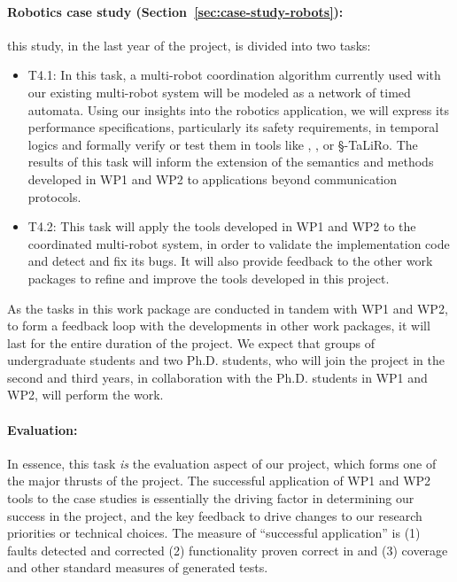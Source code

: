 \paragraph {Robotics case study (Section~\ref{sec:case-study-robots}):} this study, in the last year of the project, is divided into two tasks:
\noindent \begin{itemize}[labelsep=3pt,leftmargin=12pt]
  \item T4.1: In this task, a multi-robot coordination algorithm currently used with our existing multi-robot system will be modeled as a network of timed automata.  Using our insights into the robotics application, we will express its performance specifications, particularly its safety requirements, in temporal logics and formally verify or test them in tools like \uppaal, \prism, or \S-TaLiRo.  The results of this task will inform the extension of the semantics and methods developed in WP1 and WP2 to applications beyond communication protocols.
  \item T4.2: This task will apply the tools developed in WP1 and WP2 to the coordinated multi-robot system, in order to validate the implementation code and detect and fix its bugs.  It will also provide feedback to the other work packages to refine and improve the tools developed in this project.
  \end{itemize}

As the tasks in this work package are conducted in tandem with WP1 and WP2, to form a feedback loop with the developments in other work packages, it will last for the entire duration of the project.
We expect that groups of undergraduate students and two
Ph.D. students, who will join the project in the second and third
years, in collaboration with the Ph.D. students in WP1 and WP2, will
perform the work.

\paragraph{Evaluation:} In essence, this task \emph{is} the evaluation
aspect of our project, which forms one of the major thrusts of
the project.  The successful application of WP1 and WP2 tools to the case studies is
essentially the driving factor in determining our success in the
project, and the key feedback to drive changes to our research
priorities or technical choices.  The measure of ``successful
application'' is (1) faults detected and corrected (2) functionality
proven correct in \framac and (3) coverage and other standard measures
of generated tests.


